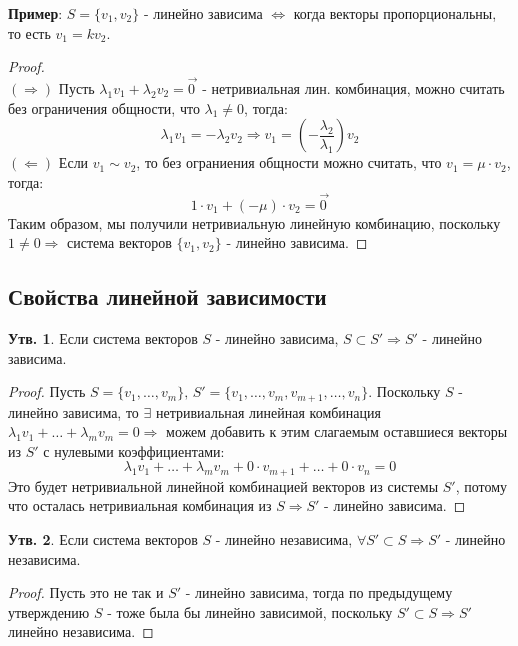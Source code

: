 \documentclass[12pt]{article}
\theoremstyle{definition}
\newtheorem{prop}{Утв.}
\newcommand{\vecm}[1]{\overrightarrow{#1\,}}
\begin{document}
\textbf{Пример}: $S = \{v_1, v_2\}$ - линейно зависима $\Leftrightarrow$ когда векторы пропорциональны, то есть $v_1 = k v_2$.
\begin{proof}\hfill\\
	$(\Rightarrow)$ Пусть $\lambda_1 v_1 + \lambda_2 v_2 = \vecm{0}$ - нетривиальная лин. комбинация, можно считать без ограничения общности, что $\lambda_1 \neq 0$, тогда:
	$$
		\lambda_1 v_1 = - \lambda_2 v_2 \Rightarrow v_1 = \left(-\dfrac{\lambda_2}{\lambda_1}\right)v_2
	$$
	$(\Leftarrow)$ Если $v_1 \sim v_2$, то без ограниения общности можно считать, что $v_1 = \mu{\cdot}v_2$, тогда:
	$$
		1{\cdot}v_1 + (-\mu){\cdot}v_2 = \vecm{0}
	$$
	Таким образом, мы получили нетривиальную линейную комбинацию, поскольку $1\neq 0 \Rightarrow$ система векторов $\{v_1,v_2\}$ - линейно зависима.
\end{proof}

\subsection*{Свойства линейной зависимости}
\begin{prop}
	Если система векторов $S$ - линейно зависима, $S \subset S' \Rightarrow S'$ - линейно зависима. 
\end{prop}
\begin{proof}
	Пусть $S = \{v_1,\dotsc, v_m\}, \, S' = \{v_1,\dotsc,v_m, v_{m+1},\dotsc, v_n\}$. Поскольку $S$ - линейно зависима, то $\exists$ нетривиальная линейная комбинация $\lambda_1 v_1 + \dotsc + \lambda_m v_m = 0 \Rightarrow$ можем добавить к этим слагаемым оставшиеся векторы из $S'$ с нулевыми коэффициентами:
	$$
		\lambda_1 v_1 + \dotsc + \lambda_m v_m + 0{\cdot}v_{m+1} + \dotsc + 0{\cdot}v_n = 0
	$$
	Это будет нетривиальной линейной комбинацией векторов из системы $S'$, потому что осталась нетривиальная комбинация из $S \Rightarrow S'$ - линейно зависима.
\end{proof}

\begin{prop}
	Если система векторов $S$ - линейно независима, $\forall S' \subset S \Rightarrow S'$ - линейно независима.	
\end{prop}
\begin{proof}
	Пусть это не так и $S'$ - линейно зависима, тогда по предыдущему утверждению $S$ - тоже была бы линейно зависимой, поскольку $S' \subset S \Rightarrow S'$ линейно независима. 
\end{proof}
\end{document}
